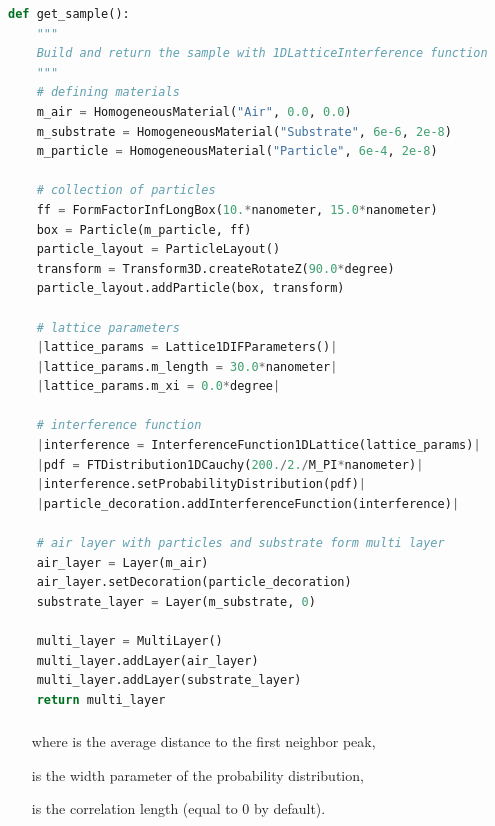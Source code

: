 \newpage
\begin{lstlisting}[language=python, style=eclipseboxed,numbers=none,nolol,caption={\Code{Python} script to generate a sample made of infinitely lonx boxes deposited on a substrate layer with the 1DLatticeInterference function. The part specific to the interferences is marked in red italic font.},label={lst:1dlattinterf}]
def get_sample():
    """
    Build and return the sample with 1DLatticeInterference function
    """
    # defining materials
    m_air = HomogeneousMaterial("Air", 0.0, 0.0)
    m_substrate = HomogeneousMaterial("Substrate", 6e-6, 2e-8)
    m_particle = HomogeneousMaterial("Particle", 6e-4, 2e-8)

    # collection of particles
    ff = FormFactorInfLongBox(10.*nanometer, 15.0*nanometer)
    box = Particle(m_particle, ff)
    particle_layout = ParticleLayout()
    transform = Transform3D.createRotateZ(90.0*degree)
    particle_layout.addParticle(box, transform)

    # lattice parameters
    |lattice_params = Lattice1DIFParameters()|
    |lattice_params.m_length = 30.0*nanometer|
    |lattice_params.m_xi = 0.0*degree|

    # interference function
    |interference = InterferenceFunction1DLattice(lattice_params)|
    |pdf = FTDistribution1DCauchy(200./2./M_PI*nanometer)|
    |interference.setProbabilityDistribution(pdf)|
    |particle_decoration.addInterferenceFunction(interference)|

    # air layer with particles and substrate form multi layer
    air_layer = Layer(m_air)
    air_layer.setDecoration(particle_decoration)
    substrate_layer = Layer(m_substrate, 0)

    multi_layer = MultiLayer()
    multi_layer.addLayer(air_layer)
    multi_layer.addLayer(substrate_layer)
    return multi_layer
\end{lstlisting} 

\newpage{\cleardoublepage}
\subsubsection{ }  \label{paragraph1dpara}
\begin{itemize}
\item[where]  is the average distance to the first neighbor peak, 
\item[] is the width parameter of the probability distribution,
\item[]  is the correlation length (equal to 0 by default).
\end{itemize}

